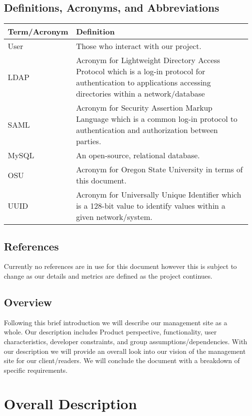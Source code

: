 \documentclass[onecolumn, draftclsnofoot,10pt, compsoc]{IEEEtran}
\begin{document}
\subsection{Definitions, Acronyms, and Abbreviations}
  \begin{tabu} to 
        \hline
        \textbf{Term/Acronym} & \textbf{Definition}\\
        \hline
        User & Those who interact with our project. \\
        \hline
        LDAP & Acronym for Lightweight Directory Access Protocol which is a log-in protocol for authentication to applications accessing directories within a network/database\\
        \hline
        SAML & Acronym for Security Assertion Markup Language which is a common log-in protocol to authentication and authorization between parties.\\
        \hline
        MySQL & An open-source, relational database.\\
        \hline
        OSU & Acronym for Oregon State University in terms of this document.\\
        \hline
        UUID & Acronym for Universally Unique Identifier which is a 128-bit value to identify values within a given network/system.\\
        \hline
\end{tabu}


\subsection{References}
Currently no references are in use for this document however this is subject to change as our details and metrics are defined as the project continues.

\subsection{Overview}
Following this brief introduction we will describe our management site as a whole. Our description includes Product perspective, functionality, user characteristics, developer constraints, and group assumptions/dependencies. With our description we will provide an overall look into our vision of the management site for our client/readers. We will conclude the document with a breakdown of specific requirements.

\section{Overall Description}
\end{document}
